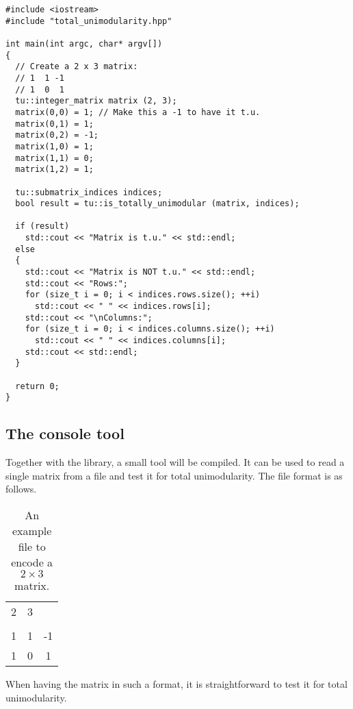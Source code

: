 \documentclass[12pt]{article}
\begin{document}
{\tiny
{}
\begin{lstlisting}
#include <iostream>
#include "total_unimodularity.hpp"

int main(int argc, char* argv[])
{
  // Create a 2 x 3 matrix:
  // 1  1 -1
  // 1  0  1
  tu::integer_matrix matrix (2, 3);
  matrix(0,0) = 1; // Make this a -1 to have it t.u.
  matrix(0,1) = 1;
  matrix(0,2) = -1;
  matrix(1,0) = 1;
  matrix(1,1) = 0;
  matrix(1,2) = 1;

  tu::submatrix_indices indices;
  bool result = tu::is_totally_unimodular (matrix, indices);

  if (result)
    std::cout << "Matrix is t.u." << std::endl;
  else
  {
    std::cout << "Matrix is NOT t.u." << std::endl;
    std::cout << "Rows:";
    for (size_t i = 0; i < indices.rows.size(); ++i)
      std::cout << " " << indices.rows[i];
    std::cout << "\nColumns:";
    for (size_t i = 0; i < indices.columns.size(); ++i)
      std::cout << " " << indices.columns[i];
    std::cout << std::endl;
  }

  return 0;
}
\end{lstlisting}}

\subsection{The console tool}

Together with the library, a small tool will be compiled. It can be used to read a single matrix from a file and test it for total unimodularity.
The file format is as follows.

\begin{table}[h]
\centering\begin{tabular}{|ccc|}
\hline
2 & 3 & \\
&& \\
1 & 1 & -1 \\
1 & 0 & 1 \\\hline
\end{tabular}
\caption{An example file to encode a $2 \times 3$ matrix.}
\end{table}

When having the matrix in such a format, it is straightforward to test it for total unimodularity.
\end{document}
